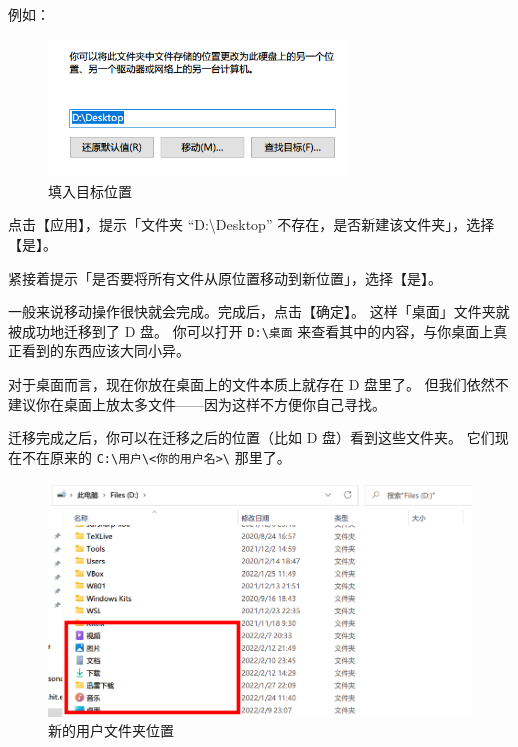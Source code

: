 例如：

\begin{figure}[htb!]
  \centering
  \includegraphics[width=8cm]{assets/Destination.png}
  \caption{填入目标位置}
  \label{Destination}
\end{figure}

点击【应用】，提示「文件夹 “D:\textbackslash{}Desktop” 不存在，是否新建该文件夹」，选择【是】。

紧接着提示「是否要将所有文件从原位置移动到新位置」，选择【是】。

一般来说移动操作很快就会完成。完成后，点击【确定】。
这样「桌面」文件夹就被成功地迁移到了 D 盘。
你可以打开 \verb|D:\桌面| 来查看其中的内容，与你桌面上真正看到的东西应该大同小异。

\begin{note}
  对于桌面而言，现在你放在桌面上的文件本质上就存在 D 盘里了。
  但我们依然不建议你在桌面上放太多文件——因为这样不方便你自己寻找。
\end{note}



迁移完成之后，你可以在迁移之后的位置（比如 D 盘）看到这些文件夹。
它们现在不在原来的 \verb|C:\用户\<你的用户名>\| 那里了。

\begin{figure}[htb!]
  \centering
  \includegraphics[width=12cm]{assets/Moved_user_directories.png}
  \caption{新的用户文件夹位置}
  \label{Moved_user_directories}
\end{figure}

